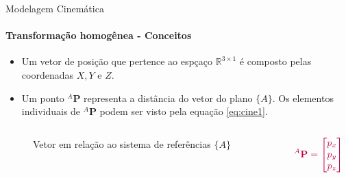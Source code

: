 \documentclass{beamer}
\begin{document}
\begin{frame}{Modelagem Cinemática}
    \framesubtitle{Transformação homogênea - Conceitos}
    \begin{itemize}
        \item Um vetor de posição que pertence ao espçaço $\mathbb{R}^{3 \times 1}$ é composto pelas coordenadas $X,Y$ e $Z$.
        \item Um ponto ${}^A\mathbf{P}$ representa a distância do vetor do plano $\{A\}$. Os elementos individuais de ${}^A\mathbf{P}$ podem ser visto pela equação \eqref{eq:cine1}.
    \end{itemize}
    \begin{columns}[c]
        \begin{column}{0.6\textwidth}
            \begin{figure}
                \centering
                \caption{Vetor em relação ao sistema de referências $\{A\}$}
                \label{fig:cine1f}
            \end{figure}
        \end{column}
        \begin{column}{0.3\textwidth}
            \begin{equation}\label{eq:cine1}
                \color{purple}{{}^A\mathbf{P} = \begin{bmatrix}
                    p_x \\ p_y \\ p_z
                \end{bmatrix}}
                \color{gray}{}
            \end{equation}
        \end{column}
    \end{columns}
\end{frame}
\end{document}
